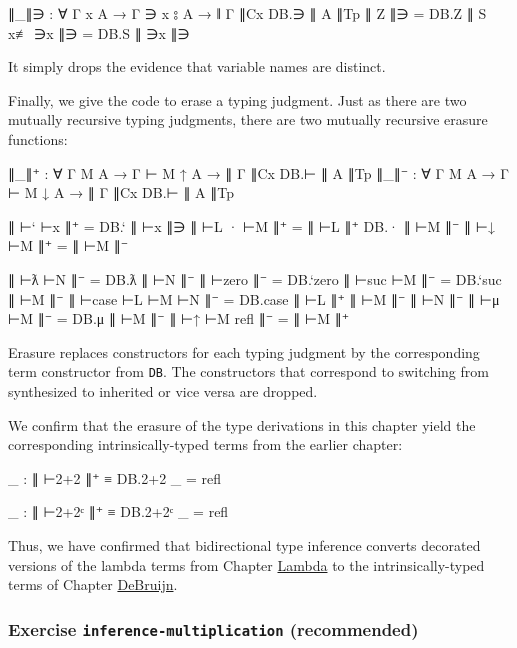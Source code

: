 \begin{fence}
\begin{code}
∥_∥∋ : ∀ {Γ x A} → Γ ∋ x ⦂ A → ∥ Γ ∥Cx DB.∋ ∥ A ∥Tp
∥ Z ∥∋               =  DB.Z
∥ S x≢ ∋x ∥∋         =  DB.S ∥ ∋x ∥∋
\end{code}
\end{fence}

It simply drops the evidence that variable names are distinct.

Finally, we give the code to erase a typing judgment. Just as there are
two mutually recursive typing judgments, there are two mutually
recursive erasure functions:

\begin{fence}
\begin{code}
∥_∥⁺ : ∀ {Γ M A} → Γ ⊢ M ↑ A → ∥ Γ ∥Cx DB.⊢ ∥ A ∥Tp
∥_∥⁻ : ∀ {Γ M A} → Γ ⊢ M ↓ A → ∥ Γ ∥Cx DB.⊢ ∥ A ∥Tp

∥ ⊢` ⊢x ∥⁺           =  DB.` ∥ ⊢x ∥∋
∥ ⊢L · ⊢M ∥⁺         =  ∥ ⊢L ∥⁺ DB.· ∥ ⊢M ∥⁻
∥ ⊢↓ ⊢M ∥⁺           =  ∥ ⊢M ∥⁻

∥ ⊢ƛ ⊢N ∥⁻           =  DB.ƛ ∥ ⊢N ∥⁻
∥ ⊢zero ∥⁻           =  DB.`zero
∥ ⊢suc ⊢M ∥⁻         =  DB.`suc ∥ ⊢M ∥⁻
∥ ⊢case ⊢L ⊢M ⊢N ∥⁻  =  DB.case ∥ ⊢L ∥⁺ ∥ ⊢M ∥⁻ ∥ ⊢N ∥⁻
∥ ⊢μ ⊢M ∥⁻           =  DB.μ ∥ ⊢M ∥⁻
∥ ⊢↑ ⊢M refl ∥⁻      =  ∥ ⊢M ∥⁺
\end{code}
\end{fence}

Erasure replaces constructors for each typing judgment by the
corresponding term constructor from \texttt{DB}. The constructors that
correspond to switching from synthesized to inherited or vice versa are
dropped.

We confirm that the erasure of the type derivations in this chapter
yield the corresponding intrinsically-typed terms from the earlier
chapter:

\begin{fence}
\begin{code}
_ : ∥ ⊢2+2 ∥⁺ ≡ DB.2+2
_ = refl

_ : ∥ ⊢2+2ᶜ ∥⁺ ≡ DB.2+2ᶜ
_ = refl
\end{code}
\end{fence}

Thus, we have confirmed that bidirectional type inference converts
decorated versions of the lambda terms from Chapter
\protect\hyperlink{Lambda}{Lambda} to the intrinsically-typed terms of
Chapter \protect\hyperlink{DeBruijn}{DeBruijn}.

\hypertarget{exercise-inference-multiplication-recommended}{%
\subsubsection{\texorpdfstring{Exercise
\texttt{inference-multiplication}
(recommended)}{Exercise inference-multiplication (recommended)}}\label{exercise-inference-multiplication-recommended}}

